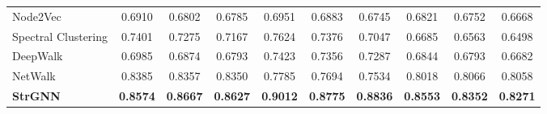 \documentclass{article}
\newcommand{\modele}{\textbf{StrGNN}}
\begin{document}
\begin{table}[ht]
{\begin{tabular}{l|ccc|ccc|ccc}
			Node2Vec &  0.6910     &    0.6802   & 0.6785 &  0.6951     &   0.6883    & 0.6745 &  0.6821  &  0.6752  &  0.6668  \\
			Spectral Clustering &  0.7401     &    0.7275   & 0.7167 &  0.7624     &   0.7376    & 0.7047 &   0.6685    &  0.6563     &  0.6498  \\
			DeepWalk  &  0.6985     &    0.6874   & 0.6793 &  0.7423     &   0.7356    & 0.7287 &  0.6844  &  0.6793  &  0.6682  \\
			NetWalk & 0.8385     &    0.8357   & 0.8350 &  0.7785     &  0.7694  & 0.7534 &   0.8018    &  0.8066  &  0.8058  \\
			\modele &  \textbf{0.8574}     &    \textbf{0.8667}   & \textbf{0.8627} &  \textbf{0.9012}  & \textbf{0.8775}  & \textbf{0.8836} & \textbf{0.8553}    &  \textbf{0.8352}  &  \textbf{0.8271}  \\
			\hline
		\end{tabular}
	}
\end{table}
\end{document}
